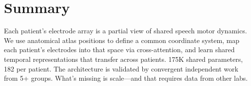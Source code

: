\documentclass[11pt,letterpaper]{article}
\begin{document}
\section*{Summary}

Each patient's electrode array is a partial view of shared speech motor dynamics. We use anatomical atlas positions to define a common coordinate system, map each patient's electrodes into that space via cross-attention, and learn shared temporal representations that transfer across patients. 175K shared parameters, 182 per patient. The architecture is validated by convergent independent work from 5+ groups. What's missing is scale---and that requires data from other labs.
\end{document}
